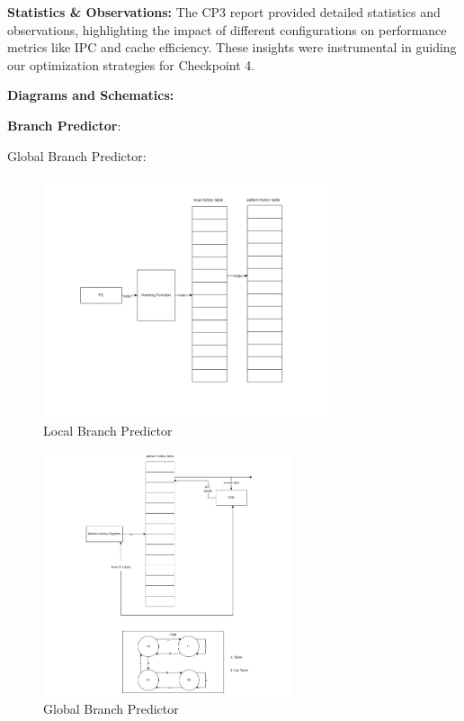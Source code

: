 \documentclass[12pt, a4paper]{article}
\begin{document}
    \textbf{Statistics \& Observations:}
    The CP3 report provided detailed statistics and observations, highlighting the impact of different configurations on performance metrics like IPC and cache efficiency. These insights were instrumental in guiding our optimization strategies for Checkpoint 4.
    
    \textbf{Diagrams and Schematics:}

    \textbf{Branch Predictor}:
    
    Global Branch Predictor:

    \begin{figure}[H]
        \centering
        \includegraphics[width=0.75\textwidth]{local_branch_predictor.png}
        \caption{Local Branch Predictor}
        \label{fig:enter-label}
    \end{figure}

    \begin{figure}[H]
        \centering
        \includegraphics[width=0.65\textwidth]{global_branch_predictor.png}
        \caption{Global Branch Predictor}
        \label{fig:enter-label}
    \end{figure}
\end{document}

